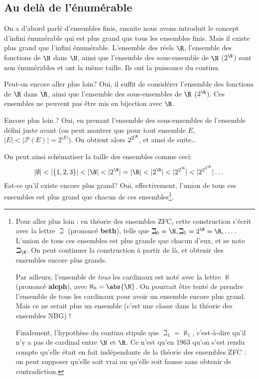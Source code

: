 \begin{myexem}
\subsection{Au delà de l'énumérable}
\label{subsec:au_dela_de_l_enumerable}
On a d'abord parlé d'ensembles finis, ensuite nous avons introduit le concept d'infini
énumérable qui est plus grand que tous les ensembles finis. Mais il existe plus grand
que l'infini énumérable. L'ensemble des réels $\R$, l'ensemble des fonctions de $\N$ dans $\N$, ainsi que
l'ensemble des sous-ensemble de $\N$ ($2^{\N}$) sont non énumérables et ont la même taille. Ils ont la puissance du continu.

Peut-on encore aller plus loin?  Oui, il suffit de considérer l'ensemble des fonctions de $\R$ dans $\R$, ainsi que
l'ensemble des sous-ensembles de $\R$ ($2^{\R}$). Ces ensembles ne peuvent pas être mis en bijection avec $\R$.

Encore plus loin ? Oui, en prenant l'ensemble des sous-ensembles de l'ensemble défini juste avant (on peut montrer que pour tout ensemble $E$, $|E|<|\mathcal{P}(E)|=2^{|E|}$). On obtient alors $2^{2^{\R}}$, et ainsi de suite\ldots

On peut ainsi schématiser la taille des ensembles comme ceci:
$$|\emptyset| < |\{1,2,3\}| < |\N| < |2^\N| = |\R| < |2^{\R}| < |2^{2^{\R}}| < |2^{2^{2^{\R}}}| \dots$$
Est-ce qu'il existe encore plus grand? Oui, effectivement, l'union de tous ces ensembles
est plus grand que chacun de ces ensembles\footnote{
Pour aller plus loin : en théorie des ensembles ZFC, cette construction s'écrit avec la lettre $\beth$ (prononcé \textbf{beth}), telle que $\beth_0 = \N, \beth_1 = 2^\N = \R,\dots$. L'union de tous ces ensembles est plus grande que chacun d'eux, et se note $\beth_\N$. On peut continuer la construction à partir de là, et obtenir des ensembles encore plus grands.

Par ailleurs, l'ensemble de \emph{tous} les cardinaux est noté avec la lettre $\aleph$ (prononcé \textbf{aleph}), avec $\aleph_0 = \abs{\N}$. On pourrait être tenté de prendre l'ensemble de tous les cardinaux pour avoir un ensemble encore plus grand. Mais ce ne serait plus un ensemble (c'est une classe dans la théorie des ensembles NBG) !

Finalement, l'hypothèse du continu stipule que $\beth_1 = \aleph_1$, c'est-à-dire qu'il n'y a pas de cardinal entre $\N$ et $\R$. Ce n'est qu'en 1963 qu'on s'est rendu compte qu'elle était en fait indépendante de la théorie des ensembles ZFC : on peut supposer qu'elle soit vrai ou qu'elle soit fausse sans obtenir de contradiction.}.



\end{myexem}
